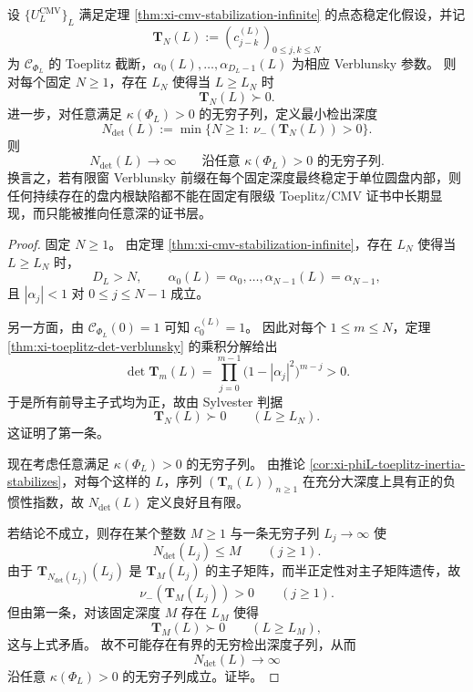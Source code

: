 \begin{theorem}\label{thm:xi-phiL-cmv-stabilization-forces-detection-depth-divergence}
设 \(\{U_L^{\mathrm{CMV}}\}_L\) 满足定理 \ref{thm:xi-cmv-stabilization-infinite} 的点态稳定化假设，并记
\[
\mathbf T_N(L):=(c^{(L)}_{j-k})_{0\le j,k\le N}
\]
为 \(\mathscr C_{\Phi_L}\) 的 Toeplitz 截断，\(\alpha_0(L),\dots,\alpha_{D_L-1}(L)\) 为相应 Verblunsky 参数。
则对每个固定 \(N\ge 1\)，存在 \(L_N\) 使得当 \(L\ge L_N\) 时
\[
\mathbf T_N(L)\succ 0.
\]
进一步，对任意满足 \(\kappa(\Phi_L)>0\) 的无穷子列，定义最小检出深度
\[
N_{\mathrm{det}}(L):=
\min\{N\ge 1:\ \nu_-(\mathbf T_N(L))>0\}.
\]
则
\[
\boxed{\;
N_{\mathrm{det}}(L)\to\infty
\qquad
\text{沿任意 }\kappa(\Phi_L)>0\text{ 的无穷子列}. \;}
\]
换言之，若有限窗 Verblunsky 前缀在每个固定深度最终稳定于单位圆盘内部，则任何持续存在的盘内根缺陷都不能在固定有限级 Toeplitz/CMV 证书中长期显现，而只能被推向任意深的证书层。
\end{theorem}
\begin{proof}
固定 \(N\ge 1\)。
由定理 \ref{thm:xi-cmv-stabilization-infinite}，存在 \(L_N\) 使得当 \(L\ge L_N\) 时，
\[
D_L>N,
\qquad
\alpha_0(L)=\alpha_0,\dots,\alpha_{N-1}(L)=\alpha_{N-1},
\]
且
\(
|\alpha_j|<1
\)
对 \(0\le j\le N-1\) 成立。

另一方面，由 \(\mathscr C_{\Phi_L}(0)=1\) 可知 \(c_0^{(L)}=1\)。
因此对每个 \(1\le m\le N\)，定理 \ref{thm:xi-toeplitz-det-verblunsky} 的乘积分解给出
\[
\det \mathbf T_m(L)
=
\prod_{j=0}^{m-1}\bigl(1-|\alpha_j|^2\bigr)^{m-j}>0.
\]
于是所有前导主子式均为正，故由 Sylvester 判据
\[
\mathbf T_N(L)\succ 0
\qquad(L\ge L_N).
\]
这证明了第一条。

现在考虑任意满足 \(\kappa(\Phi_L)>0\) 的无穷子列。
由推论 \ref{cor:xi-phiL-toeplitz-inertia-stabilizes}，对每个这样的 \(L\)，序列 \((\mathbf T_n(L))_{n\ge 1}\) 在充分大深度上具有正的负惯性指数，故 \(N_{\mathrm{det}}(L)\) 定义良好且有限。

若结论不成立，则存在某个整数 \(M\ge 1\) 与一条无穷子列 \(L_j\to\infty\) 使
\[
N_{\mathrm{det}}(L_j)\le M
\qquad(j\ge 1).
\]
由于 \(\mathbf T_{N_{\mathrm{det}}(L_j)}(L_j)\) 是 \(\mathbf T_M(L_j)\) 的主子矩阵，而半正定性对主子矩阵遗传，故
\[
\nu_-(\mathbf T_M(L_j))>0
\qquad(j\ge 1).
\]
但由第一条，对该固定深度 \(M\) 存在 \(L_M\) 使得
\[
\mathbf T_M(L)\succ 0
\qquad(L\ge L_M),
\]
这与上式矛盾。
故不可能存在有界的无穷检出深度子列，从而
\[
N_{\mathrm{det}}(L)\to\infty
\]
沿任意 \(\kappa(\Phi_L)>0\) 的无穷子列成立。证毕。
\end{proof}

